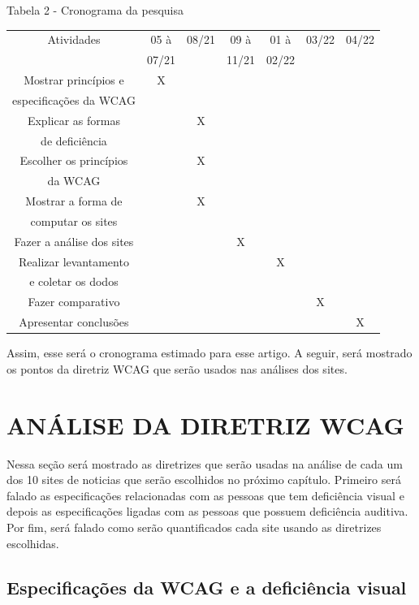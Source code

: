 \documentclass[a4paper]{article}
\begin{document}
\begin{titlepage}
Tabela 2 - Cronograma da pesquisa\\[-1cm]
\begin{center}
	\fontsize{8pt}{8pt}\selectfont
	\begin{longtable}{|c|c|c|c|c|c|c|}
		\hline
		Atividades & 05 à & 08/21 & 09 à & 01 à & 03/22 & 04/22\\
		& 07/21 & & 11/21 & 02/22 & & \\
		\hline
		Mostrar princípios e & X & & & & & \\
		especificações da WCAG & & & & & & \\
		\hline
		Explicar as formas & & X & & & & \\
		de deficiência & & & & & & \\
		\hline
		Escolher os princípios & & X & & & & \\
		da WCAG & & & & & & \\
		\hline
		Mostrar a forma de & & X & & & & \\
		computar os sites & & & & & & \\
		\hline
		Fazer a análise dos sites & & & X & & & \\
		\hline
		Realizar levantamento & & & & X & & \\
		e coletar os dodos & & & & & & \\
		\hline
		Fazer comparativo & & & & & X & \\
		\hline
		Apresentar conclusões & & & & & & X \\
		\hline
	\end{longtable}
\end{center}

Assim, esse será o cronograma estimado para esse artigo. A seguir, será mostrado os pontos da diretriz WCAG que serão usados nas análises dos sites.  

\section{ANÁLISE DA DIRETRIZ WCAG}

Nessa seção será mostrado as diretrizes que serão usadas na análise de cada um dos 10 sites de noticias que serão escolhidos no próximo capítulo. Primeiro será falado as especificações relacionadas com as pessoas que tem deficiência visual e depois as especificações ligadas com as pessoas que possuem deficiência auditiva. Por fim, será falado como serão quantificados cada site usando as diretrizes escolhidas.

\subsection{Especificações da WCAG e a deficiência visual}


\end{titlepage}
\end{document}

